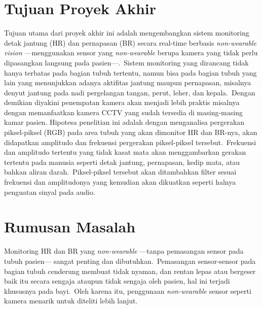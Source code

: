 \section{Tujuan Proyek Akhir} %

Tujuan utama dari proyek akhir ini adalah mengembangkan sistem monitoring detak jantung (HR) dan pernapasan (BR) secara real-time berbasis \textit{non-wearable vision} ---menggunakan sensor yang \textit{non-wearable} berupa kamera yang tidak perlu dipasangkan langsung pada pasien---.~Sistem monitoring yang dirancang tidak hanya terbatas pada bagian tubuh tertentu, namun bisa pada bagian tubuh yang lain yang menunjukkan adanya aktifitas jantung maupun pernapasan, misalnya denyut jantung pada nadi pergelangan tangan, perut, leher, dan kepala.~Dengan demikian diyakini penempatan kamera akan menjadi lebih praktis misalnya dengan memanfaatkan kamera CCTV yang sudah tersedia di masing-masing kamar pasien.
Hipotesa penelitian ini adalah dengan menganalisa pergerakan piksel-piksel (RGB) pada area tubuh yang akan dimonitor HR dan BR-nya, akan didapatkan amplitudo dan frekuensi pergerakan piksel-piksel tersebut.~Frekuensi dan amplitudo tertentu yang tidak kasat mata akan menggambarkan gerakan tertentu pada manusia seperti detak jantung, pernapasan, kedip mata, atau bahkan aliran darah.~Piksel-piksel tersebut akan ditambahkan filter sesuai frekuensi dan amplitudonya yang kemudian akan dikuatkan seperti halnya penguatan sinyal pada audio.

\section{Rumusan Masalah}  %

Monitoring HR dan BR yang \textit{non-wearable} ---tanpa pemasangan sensor pada tubuh pasien--- sangat penting dan dibutuhkan.~Pemasangan sensor-sensor pada bagian tubuh cenderung membuat tidak nyaman, dan rentan lepas atau bergeser baik itu secara sengaja ataupun tidak sengaja oleh pasien, hal ini terjadi khususnya pada bayi.~Oleh karena itu, penggunaan \textit{non-wearable} sensor seperti kamera menarik untuk diteliti lebih lanjut.

